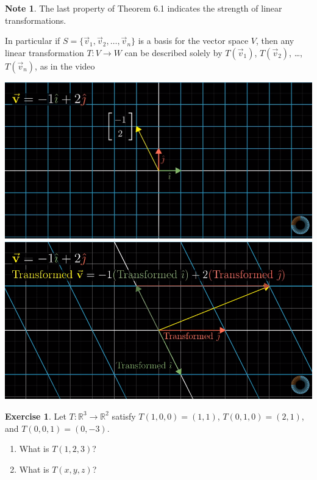 \documentclass{beamer}
\newcommand{\R}{\mathbb{R}}
\newcommand{\fn}{\insertframenumber}
\theoremstyle{definition}
\newtheorem{exercise}{Exercise}
\newtheorem*{nb}{Note}
\begin{document}
\begin{frame}{\fn}
	\begin{nb}
		The last property of Theorem 6.1 indicates the strength of linear transformations.
		
		In particular if $S=\{\vec v_1,\vec v_2,\dots,\vec v_n\}$ is a basis for the vector space $V$, then any linear transformation $T\colon V\to W$ can be described solely by $T(\vec v_1)$, $T(\vec v_2)$, \dots, $T(\vec v_n)$, as in the video
		\begin{center}
			\includegraphics[width=.4\textwidth]{../images/linear_transformation_basis_1}
			\hspace{.25in}
			\includegraphics[width=.4\textwidth]{../images/linear_transformation_basis_2}
		\end{center}
	\end{nb}
\end{frame}
\begin{frame}{\fn}
	\begin{exercise}
		Let $T:\R^3\to \R^2$ satisfy $T(1,0,0)=(1,1)$, $T(0,1,0)=(2,1)$, and $T(0,0,1)=(0,-3)$.
		\begin{enumerate}[label=(\alph*)]
			\item What is $T(1,2,3)$?
			\item What is $T(x,y,z)$?
		\end{enumerate}
	\end{exercise}
\end{frame}
\end{document}
